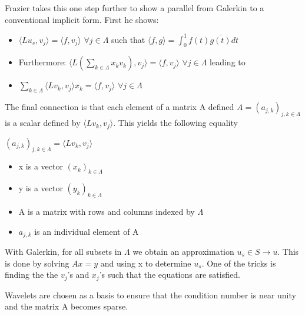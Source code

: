 \documentclass[11pt]{article}
\begin{document}
Frazier takes this one step further to show a parallel from Galerkin to a conventional implicit form.  First he shows:
\begin{itemize}
\item $\langle L u_s, v_j \rangle = \langle f, v_j \rangle$ $\forall j\in \Lambda$ such that $\langle f, g \rangle = \int ^1 _0 f(t) \bar{g(t)} dt $ 
\item Furthermore: $\langle L (\sum_{k\in \Lambda} x_k v_k), v_j \rangle = \langle f, v_j \rangle$ $\forall j\in \Lambda$ leading to
\item $\sum_{k\in \Lambda} \langle L v_k , v_j \rangle x_k = \langle f, v_j \rangle$ $\forall j\in \Lambda$ 
\end{itemize}

The final connection is that each element of a matrix A defined $A=(a_{j,k} )_{j,k \in \Lambda}$ is a scalar defined by  $\langle Lv_k , v_j \rangle$.  This yields the following equality

$(a_{j,k} )_{j,k \in \Lambda} = \langle Lv_k , v_j \rangle$
\begin{itemize}
\item x is a vector $(x_k)_{k\in \Lambda}$
\item y is a vector $(y_k)_{k\in \Lambda}$
\item A is a matrix with rows and columns indexed by $\Lambda$
\item $a_{j,k}$ is an individual element of A

\end{itemize}

With Galerkin, for all subsets in $\Lambda$ we obtain an approximation $u_s \in S \to u$.  This is done by solving $Ax=y$ and using x to determine $u_s$.  One of the tricks is finding the the $v_j$'s and $x_j$'s such that the equations are satisfied.  

Wavelets are chosen as a basis to ensure that the condition number is near unity and the matrix A becomes sparse.  
\end{document}
